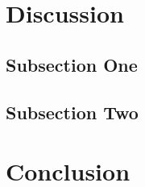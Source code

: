 \section{Discussion}

\subsection{Subsection One}

\lipsum[7] %

\subsection{Subsection Two}

\lipsum[8] %

\section{Conclusion}
